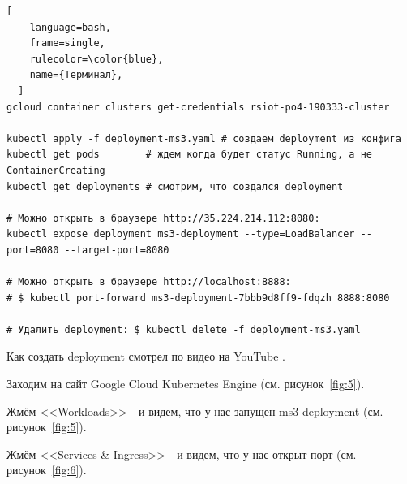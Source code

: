 \documentclass[12pt, a4paper, simple]{eskdtext}
\begin{document}
  \begin{lstlisting}[
    language=bash,
    frame=single,
    rulecolor=\color{blue},
    name={Терминал},
  ]
gcloud container clusters get-credentials rsiot-po4-190333-cluster

kubectl apply -f deployment-ms3.yaml # создаем deployment из конфига
kubectl get pods        # ждем когда будет статус Running, а не ContainerCreating
kubectl get deployments # смотрим, что создался deployment

# Можно открыть в браузере http://35.224.214.112:8080:
kubectl expose deployment ms3-deployment --type=LoadBalancer --port=8080 --target-port=8080

# Можно открыть в браузере http://localhost:8888:
# $ kubectl port-forward ms3-deployment-7bbb9d8ff9-fdqzh 8888:8080

# Удалить deployment: $ kubectl delete -f deployment-ms3.yaml
\end{lstlisting}

  

  Как создать deployment смотрел по видео на YouTube \cite{kubernetes_create_deployment}.

  Заходим на сайт Google Cloud Kubernetes Engine \cite{GoogleCloudConsole} (см. рисунок~\ref{fig:5}).

  Жмём <<Workloads>> - и видем, что у нас запущен ms3-deployment (см. рисунок~\ref{fig:5}).

  Жмём <<Services \& Ingress>> - и видем, что у нас открыт порт (см. рисунок~\ref{fig:6}).
\end{document}
